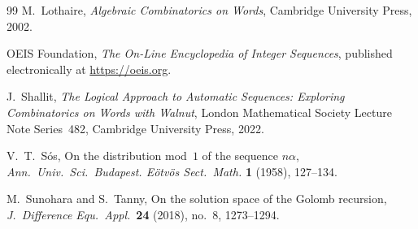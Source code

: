 \documentclass{birkjour}
\theoremstyle{definition}
\theoremstyle{remark}
\begin{document}
\begin{thebibliography}{99}
M.~Lothaire,
\emph{Algebraic Combinatorics on Words},
Cambridge University Press, 2002.

OEIS Foundation,
\emph{The On-Line Encyclopedia of Integer Sequences},
published electronically at \url{https://oeis.org}.

J.~Shallit,
\emph{The Logical Approach to Automatic Sequences:
Exploring Combinatorics on Words with Walnut},
London Mathematical Society Lecture Note Series~482,
Cambridge University Press, 2022.

V.~T.~S\'os,
On the distribution mod~$1$ of the sequence $n\alpha$,
\emph{Ann.\ Univ.\ Sci.\ Budapest. E\"otv\"os Sect.\ Math.}
\textbf{1} (1958), 127--134.

M.~Sunohara and S.~Tanny,
On the solution space of the Golomb recursion,
\emph{J.\ Difference Equ.\ Appl.}\ \textbf{24} (2018),
no.~8, 1273--1294.

\end{thebibliography}
\end{document}
